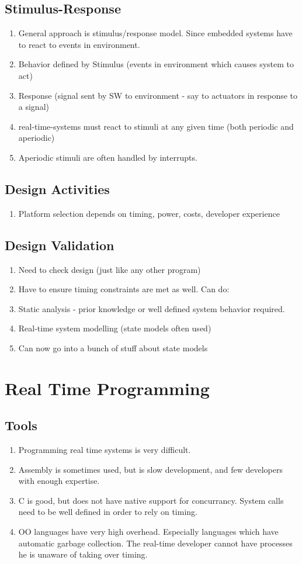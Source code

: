 \documentclass{article}
\begin{document}
\subsection{Stimulus-Response}
\begin{enumerate}
\item General approach is stimulus/response model.  Since embedded systems have to react to events in environment.
\item Behavior defined by Stimulus (events in environment which causes system to act)
\item Response (signal sent by SW to environment - say to actuators in response to a signal)
\item real-time-systems must react to stimuli at any given time (both periodic and aperiodic)
\item Aperiodic stimuli are often handled by interrupts.
\end{enumerate}
\subsection{Design Activities}
\begin{enumerate}
\item Platform selection depends on timing, power, costs, developer experience
\end{enumerate}
\subsection{Design Validation}
\begin{enumerate}
\item Need to check design (just like any other program)
\item Have to ensure timing constraints are met as well.  Can do:
\item Static analysis - prior knowledge or well defined system behavior required.
\item Real-time system modelling (state models often used)
\item Can now go into a bunch of stuff about state models
\end{enumerate}

\newpage
\section{Real Time Programming}
\subsection{Tools}
\begin{enumerate}
\item Programming real time systems is very difficult.
\item Assembly is sometimes used, but is slow development, and few developers with enough expertise.
\item C is good, but does not have native support for concurrancy.  System calls need to be well defined in order to rely on timing.
\item OO languages have very high overhead.  Especially languages which have automatic garbage collection.  The real-time developer cannot have processes he is unaware of taking over timing.
\end{enumerate}
\end{document}
